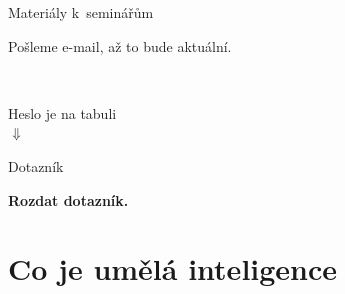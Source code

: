 \documentclass[handout,aspectratio=169,dvipsnames]{beamer}
\begin{document}
\begin{frame}{Materiály k~seminářům}

    \begin{center}
        Pošleme e-mail, až to bude aktuální.
    \end{center}

    \begin{center}
        \tt\Large
    \end{center}

    \vspace{15pt}

    \begin{center}
        \Large Heslo je na tabuli \\ $\Downarrow$
    \end{center}


\end{frame}

\begin{frame}{Dotazník}

    \begin{center}
        \bf\Huge Rozdat dotazník.
    \end{center}
\end{frame}


\section[Co je AI]{Co je umělá inteligence}

\end{document}
